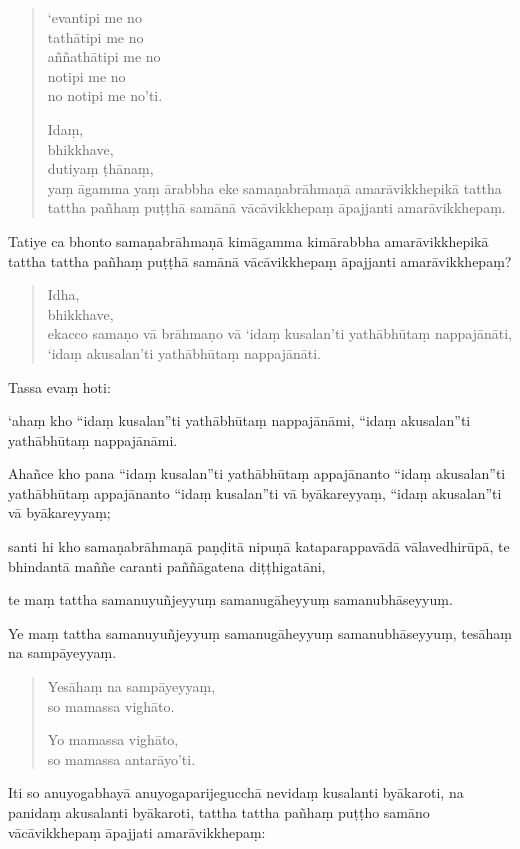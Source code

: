 \documentclass[11pt,twoside,openright]{book}
\begin{document}
\begin{verse}
‘evantipi me no\\
 tathātipi me no\\
 aññathātipi me no\\
 notipi me no\\
 no notipi me no’ti.

Idaṃ,\\
\vin  bhikkhave,\\
\vin  dutiyaṃ ṭhānaṃ,\\
\vin  yaṃ āgamma yaṃ ārabbha eke samaṇabrāhmaṇā amarāvikkhepikā tattha tattha pañhaṃ puṭṭhā samānā vācāvikkhepaṃ āpajjanti amarāvikkhepaṃ.

\end{verse}
\pstart
Tatiye ca bhonto samaṇabrāhmaṇā kimāgamma kimārabbha amarāvikkhepikā tattha tattha pañhaṃ puṭṭhā samānā vācāvikkhepaṃ āpajjanti amarāvikkhepaṃ?
\pend

\begin{verse}
Idha,\\
\vin  bhikkhave,\\
\vin  ekacco samaṇo vā brāhmaṇo vā ‘idaṃ kusalan’ti yathābhūtaṃ nappajānāti,\\
\vin  ‘idaṃ akusalan’ti yathābhūtaṃ nappajānāti.

\end{verse}
\pstart
Tassa evaṃ hoti:
\pend

\pstart
‘ahaṃ kho “idaṃ kusalan”ti yathābhūtaṃ nappajānāmi, “idaṃ akusalan”ti yathābhūtaṃ nappajānāmi.
\pend

\pstart
Ahañce kho pana “idaṃ kusalan”ti yathābhūtaṃ appajānanto “idaṃ akusalan”ti yathābhūtaṃ appajānanto “idaṃ kusalan”ti vā byākareyyaṃ, “idaṃ akusalan”ti vā byākareyyaṃ;
\pend

\pstart
santi hi kho samaṇabrāhmaṇā paṇḍitā nipuṇā kataparappavādā vālavedhirūpā, te bhindantā maññe caranti paññāgatena diṭṭhigatāni,
\pend

\pstart
te maṃ tattha samanuyuñjeyyuṃ samanugāheyyuṃ samanubhāseyyuṃ.
\pend

\pstart
Ye maṃ tattha samanuyuñjeyyuṃ samanugāheyyuṃ samanubhāseyyuṃ, tesāhaṃ na sampāyeyyaṃ.
\pend

\begin{verse}
Yesāhaṃ na sampāyeyyaṃ,\\
\vin  so mamassa vighāto.

Yo mamassa vighāto,\\
\vin  so mamassa antarāyo’ti.

\end{verse}
\pstart
Iti so anuyogabhayā anuyogaparijegucchā nevidaṃ kusalanti byākaroti, na panidaṃ akusalanti byākaroti, tattha tattha pañhaṃ puṭṭho samāno vācāvikkhepaṃ āpajjati amarāvikkhepaṃ:
\pend
\end{document}
